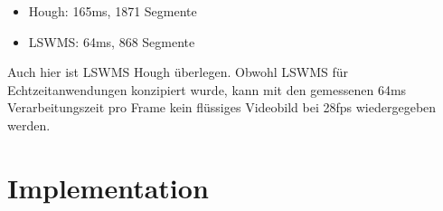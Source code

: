 \begin{itemize}
	\item Hough: 165ms, 1871 Segmente
	\item LSWMS: 64ms, 868 Segmente
\end{itemize}

Auch hier ist LSWMS Hough überlegen. Obwohl LSWMS für Echtzeitanwendungen konzipiert wurde, kann mit den gemessenen 64ms Verarbeitungszeit pro Frame kein flüssiges Videobild bei 28fps wiedergegeben werden.

\section{Implementation}



\begin{figure}
	\qquad	
	\qquad	

\end{figure}
